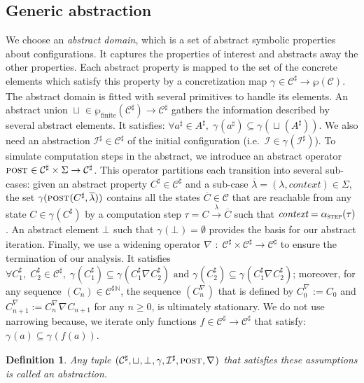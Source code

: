 \documentclass{article}
\newcommand{\bydef}{:=}
\newtheorem{definition}[thm]{Definition}
\newcommand{\initstan}{\mathcal{I}}
\newcommand{\nonstan}[1]{\overset{\scriptscriptstyle{#1}}{\scriptstyle \longrightarrow}}
\newcommand{\states}{\mathcal{C}}
\newcommand{\extendedSigma}{\Sigma}
\newcommand{\ExtendedSigma}{\extendedSigma}
\newcommand{\abst}[1]{\textsc{post}_{#1}}
\newcommand{\aunion}[1]{\sqcup_{#1}}
\newcommand{\adom}[1]{\mathcal{C}_{#1}^{\sharp}}
\newcommand{\abot}[1]{\bot_{#1}}
\newcommand{\conc}[1]{\gamma_{#1}}
\newcommand{\ainit}[1]{\mathcal{I}_{#1}^{\sharp}}
\newcommand{\wid}[1]{\nabla_{#1}}
\newcommand{\tuple}[1]{(\adom{#1},
                        \aunion{#1},
                        \abot{#1},\conc{#1},
                        \ainit{#1},
                        \abst{#1},
                        \wid{#1})}
\begin{document}
\subsection{Generic abstraction}
We choose an \emph{abstract domain}, which is  a set of abstract symbolic properties about configurations.
It captures  the properties of interest and abstracts away the other properties. Each abstract property is mapped to the set of the concrete elements which satisfy this property by a  concretization map $\conc{}\in\adom{}\rightarrow \wp(\states)$. The abstract domain is fitted with several primitives to handle its elements. 
An abstract union $\aunion{}\in \wp_{\textrm{finite}}(\adom{})\rightarrow \adom{}$ gathers the information described by several abstract elements. It satisfies: $\forall a^\sharp \in A^\sharp,\;\conc{}(a^\sharp) \subseteq \conc{}(\aunion{}(A^\sharp))$. 
We also need an abstraction $\ainit{} \in \adom{}$ of the initial configuration (i.e.~$\initstan \in \conc{}(\ainit{})$).
To simulate computation steps in the abstract, we introduce an abstract operator $\abst{}\in \adom{}\times\ExtendedSigma \rightarrow\adom{}$.  
This operator partitions each transition into several sub-cases: given an abstract property $C^\sharp\in\adom{}$ and a sub-case $\overline{\lambda}=(\lambda,\textit{context})\in\ExtendedSigma$, the set $\conc{}(\abst{}(C^{\sharp},\overline{\lambda}))$ contains all the states $\overline{C}\in\states$ that are reachable from any state $C \in \conc{}(C^\sharp)$ by a computation step $\tau = { C\nonstan{\lambda} \overline{C}}$ such that $\textit{context}=\alpha_{\textsc{step}}(\tau)$.
An abstract element $\abot{}$ such that $\conc{}(\abot{})=\emptyset$  provides the basis for our abstract iteration. Finally, we use a widening operator $\wid{}\;:\;\adom{}\times\adom{} \rightarrow \adom{}$ to ensure the termination of our analysis. It satisfies $\forall C_1^\sharp,\;C_2^\sharp \in \adom{},\;\conc{}(C_1^\sharp) \subseteq \conc{}(C_1^\sharp \wid{} C_2^\sharp)\text{ and } \conc{}(C_2^\sharp) \subseteq \conc{}(C_1^\sharp \wid{} C_2^\sharp)$; moreover,  
for any sequence $(C_n)\in{\adom{}}{}^\mathbb{N}$, the sequence $(C_n^{\wid{}})$ that is defined by $C_0^{\wid{}}\bydef C_0$ and $C_{n+1}^{\wid{}}\bydef C_n^{\wid{}}\wid{}C_{n+1}$ for any $n\geq 0$, is ultimately  stationary.
We do not use narrowing because, we iterate only functions $f\in\adom{}\rightarrow \adom{}$ that satisfy: 
$\conc{}(a)\subseteq \conc{}(f(a))$.
\begin{definition}
Any tuple $\tuple{}$ that satisfies these assumptions is called an abstraction.\end{definition}
\end{document}
